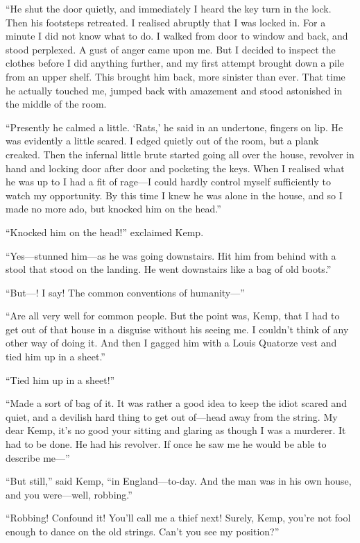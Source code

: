 “He shut the door quietly, and immediately I heard the key turn in the lock. Then his footsteps retreated. I realised abruptly that I was locked in. For a minute I did not know what to do. I walked from door to window and back, and stood perplexed. A gust of anger came upon me. But I decided to inspect the clothes before I did anything further, and my first attempt brought down a pile from an upper shelf. This brought him back, more sinister than ever. That time he actually touched me, jumped back with amazement and stood astonished in the middle of the room.

“Presently he calmed a little. ‘Rats,’ he said in an undertone, fingers on lip. He was evidently a little scared. I edged quietly out of the room, but a plank creaked. Then the infernal little brute started going all over the house, revolver in hand and locking door after door and pocketing the keys. When I realised what he was up to I had a fit of rage—I could hardly control myself sufficiently to watch my opportunity. By this time I knew he was alone in the house, and so I made no more ado, but knocked him on the head.”

“Knocked him on the head!” exclaimed Kemp.

“Yes—stunned him—as he was going downstairs. Hit him from behind with a stool that stood on the landing. He went downstairs like a bag of old boots.”

“But—! I say! The common conventions of humanity—”

“Are all very well for common people. But the point was, Kemp, that I had to get out of that house in a disguise without his seeing me. I couldn’t think of any other way of doing it. And then I gagged him with a Louis Quatorze vest and tied him up in a sheet.”

“Tied him up in a sheet!”

“Made a sort of bag of it. It was rather a good idea to keep the idiot scared and quiet, and a devilish hard thing to get out of—head away from the string. My dear Kemp, it’s no good your sitting and glaring as though I was a murderer. It had to be done. He had his revolver. If once he saw me he would be able to describe me—”

“But still,” said Kemp, “in England—to-day. And the man was in his own house, and you were—well, robbing.”

“Robbing! Confound it! You’ll call me a thief next! Surely, Kemp, you’re not fool enough to dance on the old strings. Can’t you see my position?”

